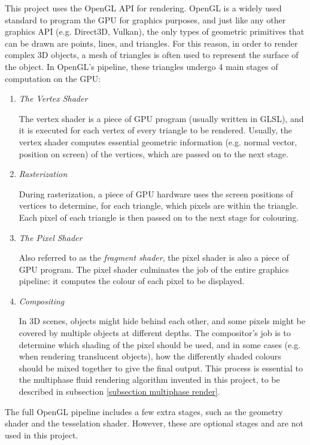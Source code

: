 This project uses the OpenGL API for rendering. OpenGL is a widely used standard to program the GPU for graphics purposes, and just like any other graphics API (e.g. Direct3D, Vulkan), the only types of geometric primitives that can be drawn are points, lines, and triangles. For this reason, in order to render complex 3D objects, a mesh of triangles is often used to represent the surface of the object. In OpenGL's pipeline, these triangles undergo 4 main stages of computation on the GPU:
\begin{enumerate}
    \item 
    \textit{The Vertex Shader}

    The vertex shader is a piece of GPU program (usually written in GLSL), and it is executed for each vertex of every triangle to be rendered. Usually, the vertex shader computes essential geometric information (e.g. normal vector, position on screen) of the vertices, which are passed on to the next stage.
    
    \item 
    \textit{Rasterization}

    During rasterization, a piece of GPU hardware uses the screen positions of vertices to determine, for each triangle, which pixels are within the triangle. Each pixel of each triangle is then passed on to the next stage for colouring.
    
    \item
    \textit{The Pixel Shader}

    Also referred to as the \textit{fragment shader}, the pixel shader is also a piece of GPU program. The pixel shader culminates the job of the entire graphics pipeline: it computes the colour of each pixel to be displayed.

    \item 
    \textit{Compositing}

    In 3D scenes, objects might hide behind each other, and some pixels might be covered by multiple objects at different depths. The compositor's job is to determine which shading of the pixel should be used, and in some cases (e.g. when rendering translucent objects), how the differently shaded colours should be mixed together to give the final output. This process is essential to the multiphase fluid rendering algorithm invented in this project, to be described in subsection \ref{subsection multiphase render}.
    
\end{enumerate}

The full OpenGL pipeline includes a few extra stages, such as the geometry shader and the tesselation shader. However, these are optional stages and are not used in this project. 


